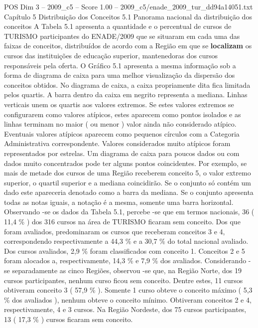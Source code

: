 \begin{textsample}{POS Dim 3 – 2009\_c5 – Score 1.00 – 2009\_c5/enade\_2009\_tur\_dd94a14051.txt}  \label{ex:f3_pos_135}
Capítulo 5 Distribuição dos Conceitos 5.1 Panorama nacional da distribuição dos conceitos A Tabela 5.1 apresenta a quantidade e o percentual de cursos de TURISMO participantes do ENADE/2009 que se situaram em cada uma das faixas de conceitos, distribuídos de acordo com a Região em que se \textbf{localizam} os cursos das instituições de educação superior, mantenedoras dos cursos responsáveis pela oferta.
O Gráfico 5.1 apresenta a mesma informação sob a forma de diagrama de caixa para uma melhor visualização da dispersão dos conceitos obtidos.
No diagrama de caixa, a caixa propriamente dita fica limitada pelos quartis.
A barra dentro da caixa em negrito representa a mediana.
Linhas verticais unem os quartis aos valores extremos.
Se estes valores extremos se configurarem como valores atípicos, estes aparecem como pontos isolados e as linhas terminam no maior ( ou menor ) valor ainda não considerado atípico.
Eventuais valores atípicos aparecem como pequenos círculos com a Categoria Administrativa correspondente.
Valores considerados muito atípicos foram representados por estrelas.
Um diagrama de caixa para poucos dados ou com dados muito concentrados pode ter alguns pontos coincidentes.
Por exemplo, se mais de metade dos cursos de uma Região receberem conceito 5, o valor extremo superior, o quartil superior e a mediana coincidirão.
Se o conjunto só contém um dado este apareceria denotado como a barra da mediana.
Se o conjunto apresenta todas as notas iguais, a notação é a mesma, somente uma barra horizontal.
Observando -se os dados da Tabela 5.1, percebe -se que em termos nacionais, 36 ( 11,4 \% ) dos 316 cursos na área de TURISMO ficaram sem conceito.
Dos que foram avaliados, predominaram os cursos que receberam conceitos 3 e 4, correspondendo respectivamente a 44,3 \% e a 30,7 \% do total nacional avaliado.
Dos cursos avaliados, 2,9 \% foram classificados com conceito 1.
Conceitos 2 e 5 foram alocados a, respectivamente, 14,3 \% e 7,9 \% dos avaliados.
Considerando -se separadamente as cinco Regiões, observou -se que, na Região Norte, dos 19 cursos participantes, nenhum curso ficou sem conceito.
Dentre estes, 11 cursos obtiveram conceito 3 ( 57,9 \% ).
Somente 1 curso obteve o conceito máximo ( 5,3 \% dos avaliados ), nenhum obteve o conceito mínimo.
Obtiveram conceitos 2 e 4, respectivamente, 4 e 3 cursos.
Na Região Nordeste, dos 75 cursos participantes, 13 ( 17,3 \% ) cursos ficaram sem conceito.

\end{textsample}
